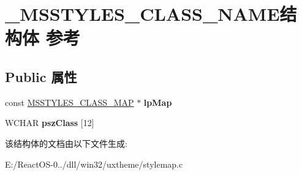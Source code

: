 \hypertarget{struct___m_s_s_t_y_l_e_s___c_l_a_s_s___n_a_m_e}{}\section{\+\_\+\+M\+S\+S\+T\+Y\+L\+E\+S\+\_\+\+C\+L\+A\+S\+S\+\_\+\+N\+A\+M\+E结构体 参考}
\label{struct___m_s_s_t_y_l_e_s___c_l_a_s_s___n_a_m_e}
\subsection*{Public 属性}
\begin{DoxyCompactItemize}
\item 
\mbox{\label{struct___m_s_s_t_y_l_e_s___c_l_a_s_s___n_a_m_e_a61d9b38427eaaca9104e95e3395e0b15}} 
const \hyperlink{struct___m_s_s_t_y_l_e_s___c_l_a_s_s___m_a_p}{M\+S\+S\+T\+Y\+L\+E\+S\+\_\+\+C\+L\+A\+S\+S\+\_\+\+M\+AP} $\ast$ {\bfseries lp\+Map}
\item 
\mbox{\label{struct___m_s_s_t_y_l_e_s___c_l_a_s_s___n_a_m_e_a93cffd83704cbfdb4c4a6d733a18870e}} 
W\+C\+H\+AR {\bfseries psz\+Class} \mbox{[}12\mbox{]}
\end{DoxyCompactItemize}


该结构体的文档由以下文件生成\+:\begin{DoxyCompactItemize}
\item 
E\+:/\+React\+O\+S-\/0../dll/win32/uxtheme/stylemap.\+c\end{DoxyCompactItemize}
